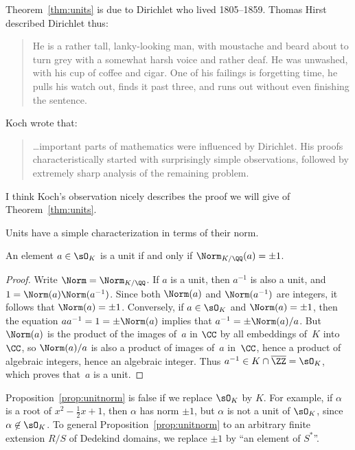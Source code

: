 \begin{remark}
	Theorem~\ref{thm:units} is due to Dirichlet who lived 1805--1859.
	Thomas Hirst described Dirichlet thus:
	\begin{quote}
		He is a rather tall, lanky-looking man, with moustache and beard about
		to turn grey with a somewhat harsh voice and rather deaf. He was
		unwashed, with his cup of coffee and cigar. One of his failings is
		forgetting time, he pulls his watch out, finds it past three, and runs
		out without even finishing the sentence.
	\end{quote}
	Koch wrote that:
	\begin{quote}
		\dots important parts of mathematics were influenced by Dirichlet. His
		proofs characteristically started with surprisingly simple observations,
		followed by extremely sharp analysis of the remaining problem.
	\end{quote}
	I think Koch's observation nicely describes the proof we will give of
	Theorem~\ref{thm:units}.
\end{remark}

Units have a simple characterization in terms of their norm.
\begin{proposition}\label{prop:unitnorm}
	An element $a \in \sO_K$ is a unit if and only if $\Norm_{K/\QQ}(a)=\pm 1$.
\end{proposition}
\begin{proof}
	Write $\Norm=\Norm_{K/\QQ}$.  If $a$ is a unit, then $a^{-1}$ is also a
	unit, and $1=\Norm(a)\Norm(a^{-1})$.  Since both $\Norm(a)$ and
	$\Norm(a^{-1})$ are integers, it follows that $\Norm(a)=\pm 1$.
	Conversely, if $a\in \sO_K$ and $\Norm(a)=\pm 1$, then the equation
	$aa^{-1}=1=\pm \Norm(a)$ implies that $a^{-1} = \pm \Norm(a)/a$.  But
	$\Norm(a)$ is the product of the images of~$a$ in $\CC$ by all
	embeddings of~$K$ into~$\CC$, so $\Norm(a)/a$ is also a product of
	images of~$a$ in~$\CC$, hence a product of algebraic integers,
	hence an algebraic integer. Thus $a^{-1} \in K \cap \overline{\ZZ} = \sO_K$,
	which proves that~$a$ is a unit.
\end{proof}

\begin{remark}
	Proposition~\ref{prop:unitnorm} is false if we replace $\sO_K$ by $K$.
	For example, if $\alpha$ is a root of $x^2-\frac{1}{2}x+1$, then
	$\alpha$ has norm $\pm 1$, but $\alpha$ is not a unit of $\sO_K$, since
	$\alpha \not\in \sO_K$.  To general Proposition~\ref{prop:unitnorm} to an
	arbitrary finite extension $R/S$ of Dedekind domains, we replace $\pm 1$
	by ``an element of $S^*$''.
\end{remark}

